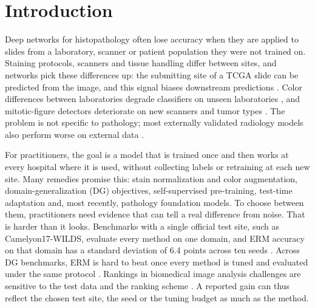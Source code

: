 \section{Introduction}
\label{sec:intro}

Deep networks for histopathology often lose accuracy when they are applied to
slides from a laboratory, scanner or patient population they were not trained
on. Staining protocols, scanners and tissue handling differ between sites, and
networks pick these differences up: the submitting site of a TCGA slide can be
predicted from the image, and this signal biases downstream predictions
\citep{howard2021site}. Color differences between laboratories degrade
classifiers on unseen laboratories \citep{tellez2019stain}, and mitotic-figure
detectors deteriorate on new scanners and tumor types
\citep{aubreville2023midog,aubreville2024midog2022}. The problem is not
specific to pathology; most externally validated radiology models also perform
worse on external data \citep{yu2022external}.

For practitioners, the goal is a model that is trained once and then works at
every hospital where it is used, without collecting labels or retraining at
each new site. Many remedies promise this: stain normalization and color
augmentation, domain-generalization (DG) objectives, self-supervised
pre-training, test-time adaptation and, most recently, pathology foundation
models. To choose between them, practitioners need evidence that can tell a
real difference from noise.
That is harder than it looks. Benchmarks with a single official test site,
such as Camelyon17-WILDS, evaluate every method on one domain, and ERM accuracy
on that domain has a standard deviation of 6.4 points across ten seeds
\citep{koh2021wilds}.
Across DG benchmarks, ERM is hard to beat once every method is tuned and
evaluated under the same protocol \citep{gulrajani2021domainbed}. Rankings in
biomedical image analysis challenges are sensitive to the test data and the
ranking scheme \citep{maierhein2018rankings}. A reported gain can thus reflect
the chosen test site, the seed or the tuning budget as much as the method.


